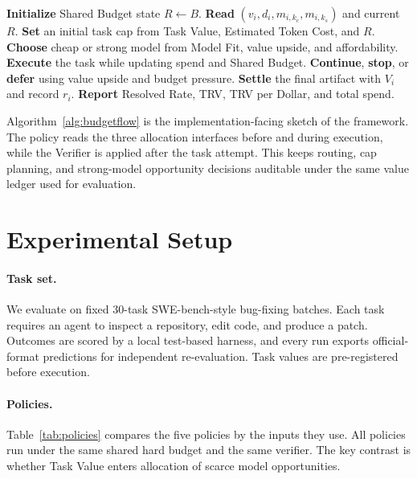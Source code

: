 \documentclass[sigconf,review,anonymous]{acmart}
\newcommand{\trv}{TRV\xspace}
\newcommand{\taskvalue}{Task Value\xspace}
\newcommand{\tokencost}{Estimated Token Cost\xspace}
\newcommand{\modelfit}{Model Fit\xspace}
\newcommand{\sharedbudget}{Shared Budget\xspace}
\newcommand{\verifier}{Verifier\xspace}
\begin{document}
\begin{algorithm}[t]
\caption{BudgetFlow batch policy sketch}
\label{alg:budgetflow}
\begin{algorithmic}[1]
\STATE \textbf{Initialize} \sharedbudget state $R \leftarrow B$.
    \STATE \textbf{Read} $(v_i,d_i,m_{i,k_c},m_{i,k_s})$ and current $R$.
    \STATE \textbf{Set} an initial task cap from \taskvalue, \tokencost, and $R$.
    \STATE \textbf{Choose} cheap or strong model from \modelfit, value upside, and affordability.
    \STATE \textbf{Execute} the task while updating spend and \sharedbudget.
    \STATE \textbf{Continue}, \textbf{stop}, or \textbf{defer} using value upside and budget pressure.
    \STATE \textbf{Settle} the final artifact with $V_i$ and record $r_i$.
\ENDFOR
\STATE \textbf{Report} Resolved Rate, \trv, \trv per Dollar, and total spend.
\end{algorithmic}
\end{algorithm}

Algorithm~\ref{alg:budgetflow} is the implementation-facing sketch of the framework. The policy reads the three allocation interfaces before and during execution, while the \verifier is applied after the task attempt. This keeps routing, cap planning, and strong-model opportunity decisions auditable under the same value ledger used for evaluation.

\section{Experimental Setup}
\label{sec:setup}
\paragraph{Task set.}
We evaluate on fixed 30-task SWE-bench-style bug-fixing batches. Each task requires an agent to inspect a repository, edit code, and produce a patch. Outcomes are scored by a local test-based harness, and every run exports official-format predictions for independent re-evaluation. Task values are pre-registered before execution.

\paragraph{Policies.}
Table~\ref{tab:policies} compares the five policies by the inputs they use. All policies run under the same shared hard budget and the same verifier. The key contrast is whether \taskvalue enters allocation of scarce model opportunities.
\end{document}
